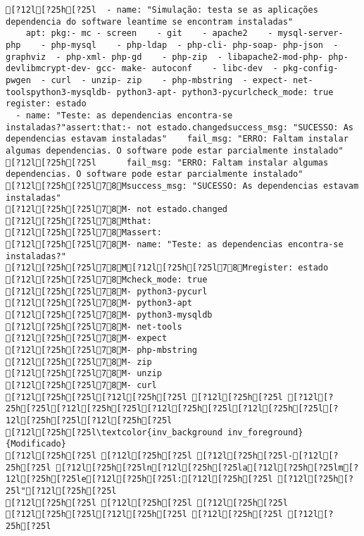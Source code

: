 \documentclass{scrartcl}
\begin{document}
\begin{Verbatim}
[?12l[?25h[?25l  - name: "Simulação: testa se as aplicações dependencia do software leantime se encontram instaladas"
    apt: pkg:- mc - screen    - git    - apache2    - mysql-server- php    - php-mysql    - php-ldap  - php-cli- php-soap- php-json  - graphviz  - php-xml- php-gd    - php-zip  - libapache2-mod-php- php-devlibmcrypt-dev- gcc- make- autoconf    - libc-dev  - pkg-config- pwgen  - curl  - unzip- zip    - php-mbstring  - expect- net-toolspython3-mysqldb- python3-apt- python3-pycurlcheck_mode: true  register: estado
  - name: "Teste: as dependencias encontra-se instaladas?"assert:that:- not estado.changedsuccess_msg: "SUCESSO: As dependencias estavam instaladas"    fail_msg: "ERRO: Faltam instalar algumas dependencias. O software pode estar parcialmente instalado"
[?12l[?25h[?25l      fail_msg: "ERRO: Faltam instalar algumas dependencias. O software pode estar parcialmente instalado"
[?12l[?25h[?25l78Msuccess_msg: "SUCESSO: As dependencias estavam instaladas"
[?12l[?25h[?25l78M- not estado.changed
[?12l[?25h[?25l78Mthat:
[?12l[?25h[?25l78Massert:
[?12l[?25h[?25l78M- name: "Teste: as dependencias encontra-se instaladas?"
[?12l[?25h[?25l78M[?12l[?25h[?25l78Mregister: estado
[?12l[?25h[?25l78Mcheck_mode: true
[?12l[?25h[?25l78M- python3-pycurl
[?12l[?25h[?25l78M- python3-apt
[?12l[?25h[?25l78M- python3-mysqldb
[?12l[?25h[?25l78M- net-tools
[?12l[?25h[?25l78M- expect
[?12l[?25h[?25l78M- php-mbstring
[?12l[?25h[?25l78M- zip
[?12l[?25h[?25l78M- unzip
[?12l[?25h[?25l78M- curl
[?12l[?25h[?25l[?12l[?25h[?25l [?12l[?25h[?25l [?12l[?25h[?25l[?12l[?25h[?25l[?12l[?25h[?25l[?12l[?25h[?25l[?12l[?25h[?25l[?12l[?25h[?25l
[?12l[?25h[?25l\textcolor{inv_background inv_foreground}{Modificado}
[?12l[?25h[?25l [?12l[?25h[?25l [?12l[?25h[?25l-[?12l[?25h[?25l [?12l[?25h[?25ln[?12l[?25h[?25la[?12l[?25h[?25lm[?12l[?25h[?25le[?12l[?25h[?25l:[?12l[?25h[?25l [?12l[?25h[?25l"[?12l[?25h[?25l
[?12l[?25h[?25l [?12l[?25h[?25l [?12l[?25h[?25l
[?12l[?25h[?25l[?12l[?25h[?25l [?12l[?25h[?25l [?12l[?25h[?25l

\end{Verbatim}
\end{document}
